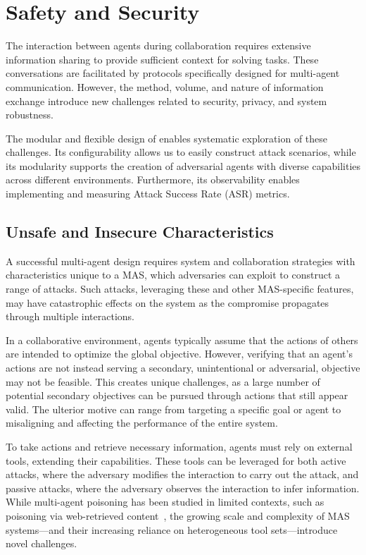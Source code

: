 \section{Safety and Security}  
The interaction between agents during collaboration requires extensive information sharing to provide sufficient context for solving tasks. These conversations are facilitated by protocols specifically designed for multi-agent communication. However, the method, volume, and nature of information exchange introduce new challenges related to security, privacy, and system robustness.

The modular and flexible design of \sys enables systematic exploration of these challenges. Its configurability allows us to easily construct attack scenarios, while its modularity supports the creation of adversarial agents with diverse capabilities across different environments. Furthermore, its observability enables implementing and measuring Attack Success Rate (ASR) metrics.


\subsection{Unsafe and Insecure Characteristics}

A successful multi-agent design requires system and collaboration strategies with characteristics unique to a MAS, which adversaries can exploit to construct a range of attacks. Such attacks, leveraging these and other MAS-specific features, may have catastrophic effects on the system as the compromise propagates through multiple interactions. 

In a collaborative environment, agents typically assume that the actions of others are intended to optimize the global objective. However, verifying that an agent’s actions are not instead serving a secondary, unintentional or adversarial, objective may not be feasible. This creates unique challenges, as a large number of potential secondary objectives can be pursued through actions that still appear valid. The ulterior motive can range from targeting a specific goal or agent to misaligning and affecting the performance of the entire system.

To take actions and retrieve necessary information, agents must rely on external tools, extending their capabilities. These tools can be leveraged for both active attacks, where the adversary modifies the interaction to carry out the attack, and passive attacks, where the adversary observes the interaction to infer information. While multi-agent poisoning has been studied in limited contexts, such as poisoning via web-retrieved content~\citep{lee2024prompt}, the growing scale and complexity of MAS systems—and their increasing reliance on heterogeneous tool sets—introduce novel challenges.

